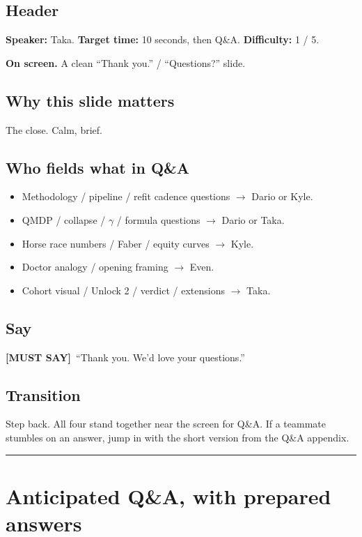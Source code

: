 \documentclass[11pt]{article}
\newcommand{\mustsay}[1]{\textcolor{must}{\textbf{[MUST SAY]}}\ #1}
\begin{document}
\subsection*{Header}

\textbf{Speaker:} Taka. \quad\textbf{Target time:} 10 seconds, then Q\&A. \quad\textbf{Difficulty:} 1 / 5.

\textbf{On screen.} A clean ``Thank you.'' / ``Questions?'' slide.

\subsection*{Why this slide matters}

The close. Calm, brief.

\subsection*{Who fields what in Q\&A}

\begin{itemize}
  \item Methodology / pipeline / refit cadence questions $\to$ Dario or Kyle.
  \item QMDP / collapse / $\gamma$ / formula questions $\to$ Dario or Taka.
  \item Horse race numbers / Faber / equity curves $\to$ Kyle.
  \item Doctor analogy / opening framing $\to$ Even.
  \item Cohort visual / Unlock 2 / verdict / extensions $\to$ Taka.
\end{itemize}

\subsection*{Say}

\mustsay{``Thank you. We'd love your questions.''}

\subsection*{Transition}

Step back. All four stand together near the screen for Q\&A. If a teammate stumbles on an answer, jump in with the short version from the Q\&A appendix.

\bigskip\hrule

\section*{Anticipated Q\&A, with prepared answers}
\end{document}
